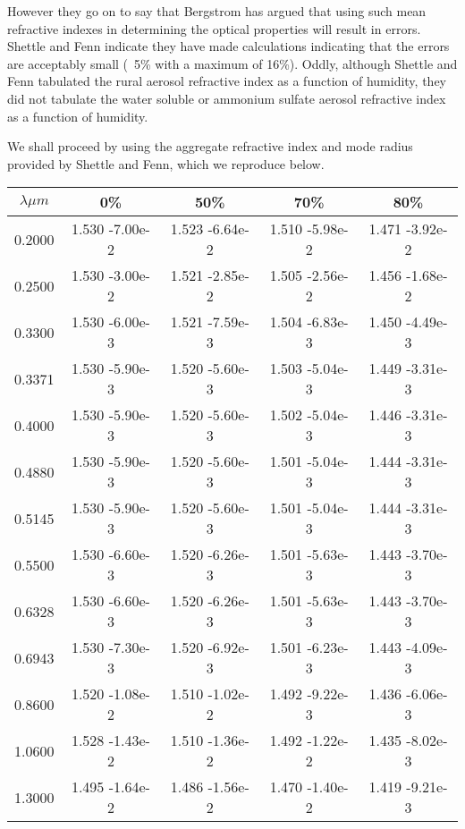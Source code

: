 \documentclass[12pt]{article}
\begin{document}
However they go on to say that Bergstrom has argued that using such mean 
refractive indexes  in determining the optical properties will result in errors. Shettle and 
Fenn indicate they have made calculations indicating that the errors
are acceptably small (~5\% with a maximum of 16\%). Oddly, although Shettle and Fenn tabulated
the rural aerosol refractive index as a function of humidity, they did not tabulate
the water soluble or ammonium sulfate aerosol refractive index as a function of
humidity.

We shall proceed by using the aggregate refractive index and mode radius 
provided by Shettle and Fenn, which we reproduce below. 

\begin{center}
\begin{table}
\begin{tabular}{| c | c | c | c | c |  }
\hline
 $\lambda \mu m$ & 0\%  & 50\%  & 70\%  &  80\%  \\
\hline
0.2000 & 1.530 -7.00e-2  & 1.523 -6.64e-2 &     1.510 -5.98e-2 & 1.471 -3.92e-2 \\
0.2500  &  1.530 -3.00e-2  &  1.521 -2.85e-2  &  1.505 -2.56e-2  &  1.456 -1.68e-2   \\
0.3300  &  1.530 -6.00e-3  &  1.521 -7.59e-3 &   1.504 -6.83e-3  &  1.450 -4.49e-3  \\
0.3371  &  1.530 -5.90e-3  &  1.520 -5.60e-3  &  1.503 -5.04e-3   & 1.449 -3.31e-3 \\
0.4000 &   1.530 -5.90e-3  &  1.520 -5.60e-3  &  1.502 -5.04e-3  &  1.446 -3.31e-3 \\
0.4880  &  1.530 -5.90e-3  &  1.520 -5.60e-3  &  1.501 -5.04e-3  &  1.444 -3.31e-3 \\
0.5145  &  1.530 -5.90e-3 &   1.520 -5.60e-3  &  1.501 -5.04e-3  &  1.444 -3.31e-3  \\
0.5500  &  1.530 -6.60e-3  &  1.520 -6.26e-3  &  1.501 -5.63e-3  &  1.443 -3.70e-3  \\
0.6328  &  1.530 -6.60e-3 &   1.520 -6.26e-3  &  1.501 -5.63e-3  &  1.443 -3.70e-3  \\ 
0.6943 &   1.530 -7.30e-3 &   1.520 -6.92e-3  &   1.501 -6.23e-3 &   1.443 -4.09e-3  \\ 
0.8600 &   1.520 -1.08e-2  &  1.510 -1.02e-2  &  1.492 -9.22e-3  &  1.436 -6.06e-3  \\ 
1.0600  &  1.528 -1.43e-2  &  1.510 -1.36e-2  &  1.492 -1.22e-2  &  1.435 -8.02e-3  \\ 
1.3000  &  1.495 -1.64e-2  &  1.486 -1.56e-2  &  1.470 -1.40e-2  &  1.419 -9.21e-3  \\

\end{tabular}
\end{table}
\end{center}
\end{document}
